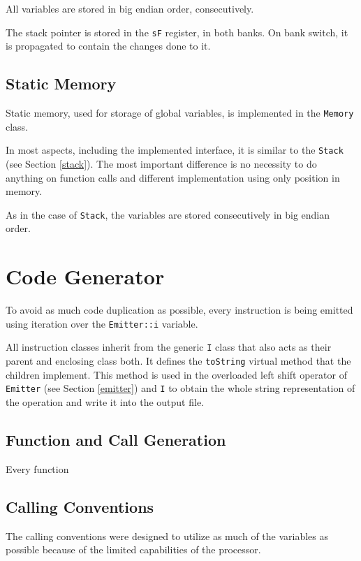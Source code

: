         All variables are stored in big endian order, consecutively.

        The stack pointer is stored in the \texttt{sF} register, in both banks. On bank switch, it is propagated to contain the changes done to it.

        \subsection{Static Memory}

        Static memory, used for storage of global variables, is implemented in the \texttt{Memory} class.

        In most aspects, including the implemented interface, it is similar to the \texttt{Stack} (see Section \ref{stack}). The most important difference is no necessity to do anything on function calls and different implementation using only position in memory.

        As in the case of \texttt{Stack}, the variables are stored consecutively in big endian order.

    \section{Code Generator}

    To avoid as much code duplication as possible, every instruction is being emitted using iteration over the \texttt{Emitter::i} variable.

    All instruction classes inherit from the generic \texttt{I} class that also acts as their parent and enclosing class both. It defines the \texttt{toString} virtual method that the children implement. This method is used in the overloaded left shift operator of \texttt{Emitter} (see Section \ref{emitter}) and \texttt{I} to obtain the whole string representation of the operation and write it into the output file.

        \subsection{Function and Call Generation}

        Every function 

        \subsection{Calling Conventions}

        The calling conventions were designed to utilize as much of the variables as possible because of the limited capabilities of the processor.

